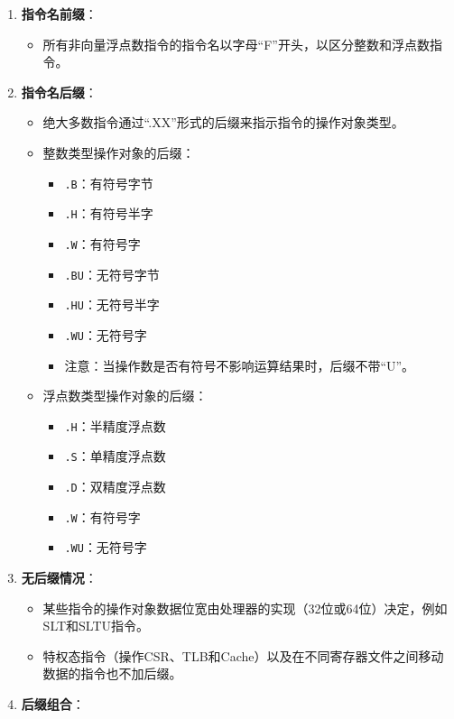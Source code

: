 \begin{enumerate}
\def\labelenumi{\arabic{enumi}.}
\tightlist
\item
  \textbf{指令名前缀}：

  \begin{itemize}
  \tightlist
  \item
    所有非向量浮点数指令的指令名以字母``F''开头，以区分整数和浮点数指令。
  \end{itemize}
\item
  \textbf{指令名后缀}：

  \begin{itemize}
  \tightlist
  \item
    绝大多数指令通过``.XX''形式的后缀来指示指令的操作对象类型。
  \item
    整数类型操作对象的后缀：

    \begin{itemize}
    \tightlist
    \item
      \texttt{.B}：有符号字节
    \item
      \texttt{.H}：有符号半字
    \item
      \texttt{.W}：有符号字
    \item
      \texttt{.BU}：无符号字节
    \item
      \texttt{.HU}：无符号半字
    \item
      \texttt{.WU}：无符号字
    \item
      注意：当操作数是否有符号不影响运算结果时，后缀不带``U''。
    \end{itemize}
  \item
    浮点数类型操作对象的后缀：

    \begin{itemize}
    \tightlist
    \item
      \texttt{.H}：半精度浮点数
    \item
      \texttt{.S}：单精度浮点数
    \item
      \texttt{.D}：双精度浮点数
    \item
      \texttt{.W}：有符号字
    \item
      \texttt{.WU}：无符号字
    \end{itemize}
  \end{itemize}
\item
  \textbf{无后缀情况}：

  \begin{itemize}
  \tightlist
  \item
    某些指令的操作对象数据位宽由处理器的实现（32位或64位）决定，例如SLT和SLTU指令。
  \item
    特权态指令（操作CSR、TLB和Cache）以及在不同寄存器文件之间移动数据的指令也不加后缀。
  \end{itemize}
\item
  \textbf{后缀组合}：


\end{enumerate}

